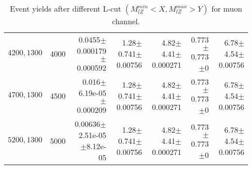 \documentclass[]{article}
\begin{document}
\begin{table}
\begin{center}
{\begin{tabular}{ |r|r|r|r|r|r|r|}
$4200,1300$ & 4000 & 0.0455$\pm$0.000179$\pm$0.000592 & 1.28$\pm$0.741$\pm$0.00756 & 4.82$\pm$4.41$\pm$0.000271 & 0.773$\pm$0.773$\pm$0 & 6.78$\pm$4.54$\pm$0.00756 \\
$4700,1300$ & 4500 & 0.016$\pm$6.19e-05$\pm$0.000209 & 1.28$\pm$0.741$\pm$0.00756 & 4.82$\pm$4.41$\pm$0.000271 & 0.773$\pm$0.773$\pm$0 & 6.78$\pm$4.54$\pm$0.00756 \\
$5200,1300$ & 5000 & 0.00636$\pm$2.51e-05$\pm$8.12e-05 & 1.28$\pm$0.741$\pm$0.00756 & 4.82$\pm$4.41$\pm$0.000271 & 0.773$\pm$0.773$\pm$0 & 6.78$\pm$4.54$\pm$0.00756 \\
\hline 
\end{tabular}
}
\end{center}
\caption{Event yields after different L-cut $(M_{lZ}^{min} < X, M_{lZ}^{max} > Y)$ for muon channel.}
\end{table}
\end{document}
